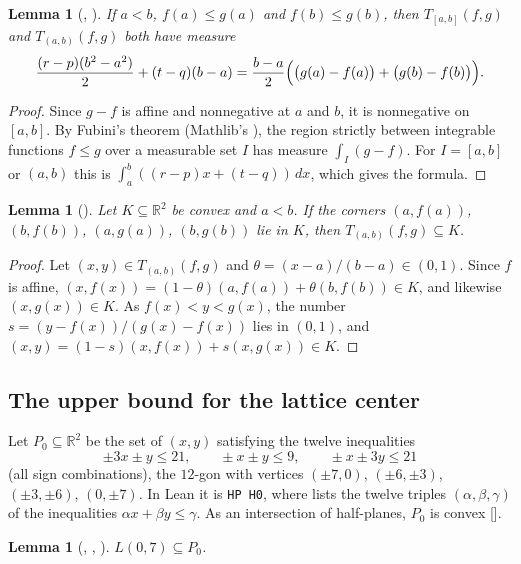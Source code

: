 \documentclass[11pt]{amsart}
\theoremstyle{plain}
\newtheorem{lemma}[theorem]{Lemma}
\theoremstyle{definition}
\newcommand{\R}{\mathbb{R}}
\begin{document}
\begin{lemma}[, ]\label{lem:area}
If $a<b$, $f(a)\le g(a)$ and $f(b)\le g(b)$, then $T_{[a,b]}(f,g)$ and $T_{(a,b)}(f,g)$ both have measure
\[
  \frac{(r-p)(b^2-a^2)}{2}+(t-q)(b-a)=\frac{b-a}{2}\Bigl(\bigl(g(a)-f(a)\bigr)+\bigl(g(b)-f(b)\bigr)\Bigr).
\]
\end{lemma}

\begin{proof}
Since $g-f$ is affine and nonnegative at $a$ and $b$, it is nonnegative on $[a,b]$. By Fubini's theorem (Mathlib's ), the region strictly between integrable functions $f\le g$ over a measurable set $I$ has measure $\int_I(g-f)$. For $I=[a,b]$ or $(a,b)$ this is $\int_a^b((r-p)x+(t-q))\,dx$, which gives the formula.
\end{proof}

\begin{lemma}[]\label{lem:inside}
Let $K\subseteq\R^2$ be convex and $a<b$. If the corners $(a,f(a))$, $(b,f(b))$, $(a,g(a))$, $(b,g(b))$ lie in $K$, then $T_{(a,b)}(f,g)\subseteq K$.
\end{lemma}

\begin{proof}
Let $(x,y)\in T_{(a,b)}(f,g)$ and $\theta=(x-a)/(b-a)\in(0,1)$. Since $f$ is affine, $(x,f(x))=(1-\theta)(a,f(a))+\theta(b,f(b))\in K$, and likewise $(x,g(x))\in K$. As $f(x)<y<g(x)$, the number $s=(y-f(x))/(g(x)-f(x))$ lies in $(0,1)$, and $(x,y)=(1-s)(x,f(x))+s(x,g(x))\in K$.
\end{proof}

\subsection{The upper bound for the lattice center}
Let $P_0\subseteq\R^2$ be the set of $(x,y)$ satisfying the twelve inequalities
\begin{equation}\label{eq:H0}
  \pm3x\pm y\le21,\qquad \pm x\pm y\le 9,\qquad \pm x\pm3y\le21
\end{equation}
(all sign combinations), the $12$-gon with vertices $(\pm7,0)$, $(\pm6,\pm3)$, $(\pm3,\pm6)$, $(0,\pm7)$. In Lean it is \texttt{HP H0}, where  lists the twelve triples $(\alpha,\beta,\gamma)$ of the inequalities $\alpha x+\beta y\le\gamma$. As an intersection of half-planes, $P_0$ is convex [].

\begin{lemma}[, , ]\label{lem:check0}
$L(0,7)\subseteq P_0$.
\end{lemma}
\end{document}
